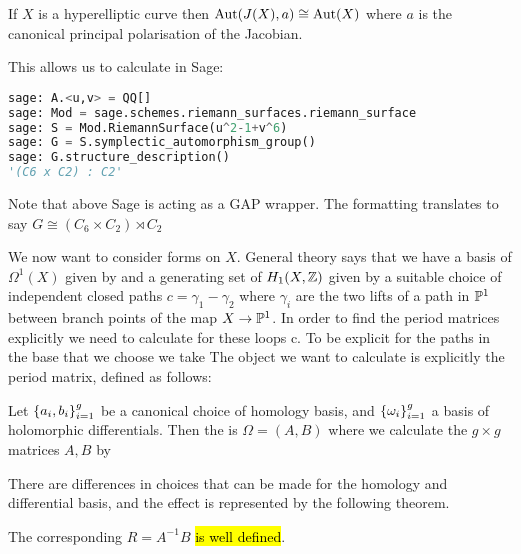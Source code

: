 \documentclass{article}
\begin{document}
\begin{lemma}
	If $X$ is a hyperelliptic curve then $\operatorname{Aut}(J(X),a) \cong \operatorname{Aut}(X)$ where $a$ is the canonical principal polarisation of the Jacobian. 
\end{lemma}
This allows us to calculate in Sage:
\begin{lstlisting}[language=Python,frame=single]
sage: A.<u,v> = QQ[]
sage: Mod = sage.schemes.riemann_surfaces.riemann_surface
sage: S = Mod.RiemannSurface(u^2-1+v^6)
sage: G = S.symplectic_automorphism_group()
sage: G.structure_description()
'(C6 x C2) : C2'
\end{lstlisting}
\begin{remark}
	Note that above Sage is acting as a GAP wrapper. The formatting translates to say $G \cong (C_6 \times C_2) \rtimes C_2$
\end{remark}
We now want to consider forms on $X$. General theory says that we have a basis of $\Omega^1(X)$ given by 
and a generating set of $H_1(X,\mathbb{Z})$ given by a suitable choice of independent closed paths $c = \gamma_1 - \gamma_2$ where $\gamma_i$ are the two lifts of a path in $\mathbb{P}^1$ between branch points of the map $X \to \mathbb{P}^1$. In order to find the period matrices explicitly we need to calculate 
for these loops c. To be explicit for the paths in the base that we choose we take 
The object we want to calculate is explicitly the period matrix, defined as follows:
\begin{definition}
	Let $\left\{ a_i, b_i \right\}_{i=1}^g$ be a canonical choice of homology basis, and $\left\{ \omega_i \right\}_{i=1}^g$ a basis of holomorphic differentials. Then the  is $\Omega = (A,B)$ where we calculate the $g\times g$ matrices $A,B$ by 
\end{definition}
There are differences in choices that can be made for the homology and differential basis, and the effect is represented by the following theorem.
\begin{lemma}
	The corresponding  $R = A^{-1}B$ \hl{is well defined}. 
\end{lemma}
\end{document}
